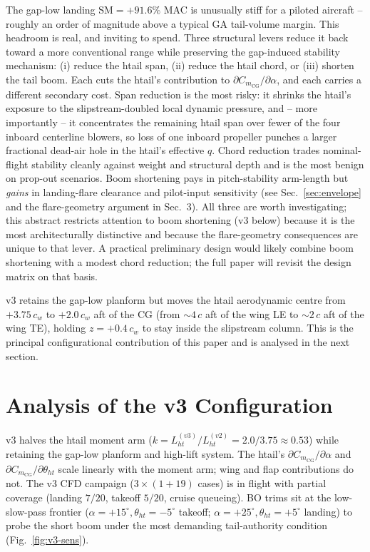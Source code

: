 \documentclass[conf]{new-aiaa}
\newcommand{\sm}{\mathrm{SM}}
\begin{document}
The gap-low landing $\sm = +91.6\%$ MAC is unusually stiff
for a piloted aircraft -- roughly an order of magnitude above
a typical GA tail-volume margin.  This headroom is real, and
inviting to spend.  Three structural levers reduce it back
toward a more conventional range while preserving the
gap-induced stability mechanism: (i) reduce the htail span,
(ii) reduce the htail chord, or (iii) shorten the tail boom.
Each cuts the htail's contribution to
$\partial C_{m_{\mathrm{CG}}}/\partial\alpha$, and each carries
a different secondary cost.  Span reduction is the most
risky: it shrinks the htail's exposure to the
slipstream-doubled local dynamic pressure, and -- more
importantly -- it concentrates the remaining htail span over
fewer of the four inboard centerline blowers, so loss of one
inboard propeller punches a larger fractional dead-air hole
in the htail's effective $q$.  Chord reduction trades
nominal-flight stability cleanly against weight and structural
depth and is the most benign on prop-out scenarios.  Boom
shortening pays in pitch-stability arm-length but \emph{gains}
in landing-flare clearance and pilot-input sensitivity (see
Sec.~\ref{sec:envelope} and the flare-geometry argument in
Sec.~3).  All three are worth investigating; this abstract
restricts attention to boom shortening (v3 below) because it
is the most architecturally distinctive and because the
flare-geometry consequences are unique to that lever.  A
practical preliminary design would likely combine boom
shortening with a modest chord reduction; the full paper will
revisit the design matrix on that basis.

v3 retains the gap-low planform but moves the htail
aerodynamic centre from $+3.75\,c_w$ to $+2.0\,c_w$ aft of the
CG (from $\sim 4\,c$ aft of the wing LE to $\sim 2\,c$ aft of
the wing TE), holding $z=+0.4\,c_w$ to stay inside the
slipstream column.  This is the principal configurational
contribution of this paper and is analysed in the next
section.

\section{Analysis of the v3 Configuration}

v3 halves the htail moment arm
($k=L_{ht}^{(v3)}/L_{ht}^{(v2)}=2.0/3.75\approx 0.53$) while
retaining the gap-low planform and high-lift system.  The
htail's $\partial C_{m_{\mathrm{CG}}}/\partial\alpha$ and
$\partial C_{m_{\mathrm{CG}}}/\partial\theta_{ht}$ scale
linearly with the moment arm; wing and flap contributions do
not.  The v3 CFD campaign ($3\times(1+19)$ cases) is in flight
with partial coverage (landing $7/20$, takeoff $5/20$, cruise
queueing).  BO trims sit at the low-slow-pass frontier
($\alpha=+15^\circ,\theta_{ht}=-5^\circ$ takeoff;
$\alpha=+25^\circ,\theta_{ht}=+5^\circ$ landing) to probe the
short boom under the most demanding tail-authority condition
(Fig.~\ref{fig:v3-sens}).
\end{document}
